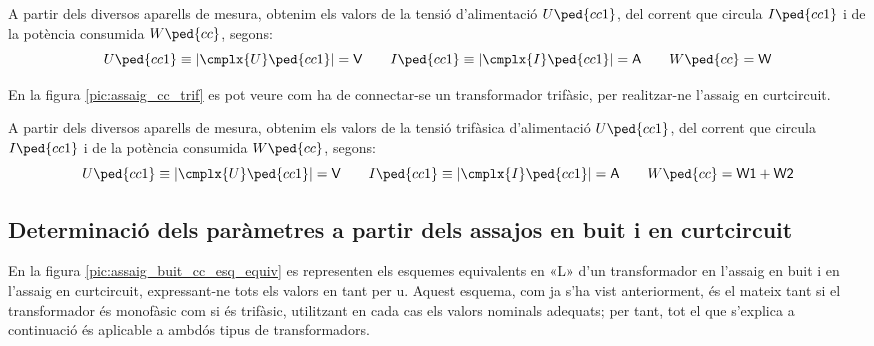 A partir dels diversos aparells de mesura, obtenim els valors de la
tensió d'alimentació $U\ped{cc1}$, del corrent que circula
$I\ped{cc1}$ i de la potència consumida $W\ped{cc}$, segons:
\begin{equation}
    U\ped{cc1}\equiv|\cmplx{U}\ped{cc1}|=\textsf{V} \qquad
    I\ped{cc1}\equiv|\cmplx{I}\ped{cc1}|=\textsf{A}
     \qquad W\ped{cc}=\textsf{W}
\end{equation}

En la figura \vref{pic:assaig_cc_trif} es pot veure com ha de
connectar-se un transformador trifàsic, per realitzar-ne l'assaig en curtcircuit.

\begin{center}
    
    \label{pic:assaig_cc_trif}
\end{center}


A partir dels diversos aparells de mesura, obtenim els valors de la
tensió trifàsica d'alimentació $U\ped{cc1}$, del corrent que circula
$I\ped{cc1}$ i de la potència consumida $W\ped{cc}$, segons:
\begin{equation}
    U\ped{cc1}\equiv|\cmplx{U}\ped{cc1}|=\textsf{V} \qquad
    I\ped{cc1}\equiv|\cmplx{I}\ped{cc1}|=\textsf{A} \qquad
    W\ped{cc}=\textsf{W1}+\textsf{W2}
\end{equation}

\subsection{Determinació dels paràmetres a partir dels assajos en buit i en curtcircuit}

En la figura \vref{pic:assaig_buit_cc_esq_equiv}  es representen els
esquemes equivalents en «L» d'un transformador en l'assaig en buit i
en l'assaig en curtcircuit, expressant-ne tots els valors en tant per u.
Aquest esquema, com ja s'ha vist anteriorment, és el mateix tant si
el transformador és monofàsic com si és trifàsic, utilitzant en cada
cas els valors nominals adequats; per tant, tot el que s'explica  a
continuació és aplicable a ambdós tipus de transformadors.

\begin{center}
    
     \label{pic:assaig_buit_cc_esq_equiv}
\end{center}

